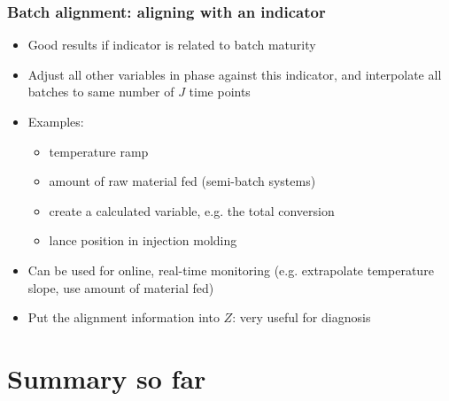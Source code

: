 \documentclass[handout, 12pt]{beamer}
\begin{document}
\begin{frame}\frametitle{Batch alignment: aligning with an indicator}

\begin{itemize}
	
	\item	Good results if indicator is related to batch maturity
	
	\item	Adjust all other variables in phase against this indicator, and interpolate all batches to same number of \( J \) time points
	
	\item	Examples: 
			
			\begin{itemize}
				\item	temperature ramp
				
				\item	amount of raw material fed (semi-batch systems)
				
				\item	create a calculated variable, e.g. the total conversion
				
				\item	lance position in injection molding
			\end{itemize}
			
			\pause
	
	\item	Can be used for online, real-time monitoring (e.g. extrapolate temperature slope, use amount of material fed) \pause
	
	\item	Put the alignment information into \( Z \): very useful for diagnosis
\end{itemize}


\end{frame}

\section{Summary so far}
\end{document}
